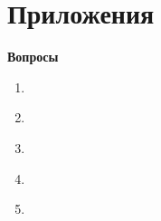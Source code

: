 \documentclass[t]{beamer}  %
\begin{document}
	\section{Приложения}
	
	\begin{frame}{\textbf{Вопросы}}
	
		\begin{enumerate}
			\item \hyperlink{drf-fairness}{}
			\item \hyperlink{default-profiles}{} 
			\item \hyperlink{output-monitoring}{}
			\item \hyperlink{async-speedup}{}
			\item \hyperlink{dsmodeling}{} 
		\end{enumerate}
	\end{frame}
\end{document}
